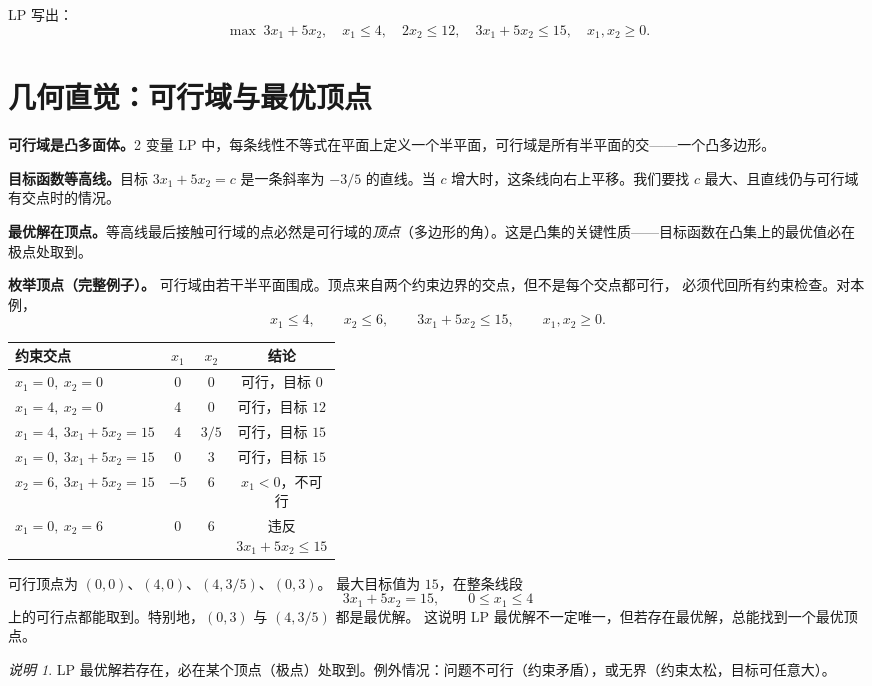 \documentclass[UTF8,openany,12pt]{ctexbook}
\theoremstyle{remark}
\newtheorem{remark}{说明}[chapter]
\begin{document}
\noindent LP 写出：
\[
  \max\;3x_1+5x_2,\quad x_1\le 4,\quad 2x_2\le 12,\quad 3x_1+5x_2\le 15,\quad x_1,x_2\ge 0.
\]

\section{几何直觉：可行域与最优顶点}

\noindent\textbf{可行域是凸多面体。}2 变量 LP 中，每条线性不等式在平面上定义一个半平面，可行域是所有半平面的交——一个凸多边形。

\noindent\textbf{目标函数等高线。}目标 $3x_1+5x_2=c$ 是一条斜率为 $-3/5$ 的直线。当 $c$ 增大时，这条线向右上平移。我们要找 $c$ 最大、且直线仍与可行域有交点时的情况。

\noindent\textbf{最优解在顶点。}等高线最后接触可行域的点必然是可行域的\emph{顶点}（多边形的角）。这是凸集的关键性质——目标函数在凸集上的最优值必在极点处取到。

\noindent\textbf{枚举顶点（完整例子）。}
可行域由若干半平面围成。顶点来自两个约束边界的交点，但不是每个交点都可行，
必须代回所有约束检查。对本例，
\[
  x_1\le4,\qquad x_2\le6,\qquad 3x_1+5x_2\le15,\qquad x_1,x_2\ge0.
\]

\begin{center}
\small
\begin{tabular}{p{0.38\linewidth}ccc}
\toprule
约束交点 & $x_1$ & $x_2$ & 结论 \\
\midrule
$x_1=0,\ x_2=0$ & 0 & 0 & 可行，目标 $0$ \\
$x_1=4,\ x_2=0$ & 4 & 0 & 可行，目标 $12$ \\
$x_1=4,\ 3x_1+5x_2=15$ & 4 & $3/5$ & 可行，目标 $15$ \\
$x_1=0,\ 3x_1+5x_2=15$ & 0 & 3 & 可行，目标 $15$ \\
$x_2=6,\ 3x_1+5x_2=15$ & $-5$ & 6 & $x_1<0$，不可行 \\
$x_1=0,\ x_2=6$ & 0 & 6 & 违反 $3x_1+5x_2\le15$ \\
\bottomrule
\end{tabular}
\end{center}

\noindent 可行顶点为 $(0,0)$、$(4,0)$、$(4,3/5)$、$(0,3)$。
最大目标值为 $15$，在整条线段
\[
  3x_1+5x_2=15,\qquad 0\le x_1\le4
\]
上的可行点都能取到。特别地，$(0,3)$ 与 $(4,3/5)$ 都是最优解。
这说明 LP 最优解不一定唯一，但若存在最优解，总能找到一个最优顶点。

\begin{remark}
LP 最优解若存在，必在某个顶点（极点）处取到。例外情况：问题不可行（约束矛盾），或无界（约束太松，目标可任意大）。
\end{remark}
\end{document}
